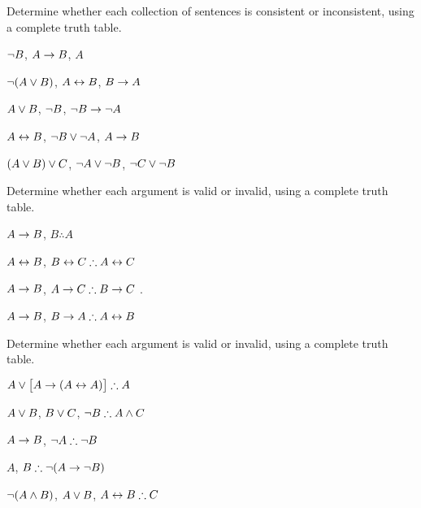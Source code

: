 \begin{practiceproblems}
\noindent\problempart
\label{pr.TT.satisfiable3}
Determine whether each collection of sentences is consistent or inconsistent, using a complete truth table.
\begin{earg}
\item $\neg B$, $A \rightarrow B$, $A$ \vspace{.5ex} \hfill {}
\item $\neg(A \vee B)$, $A \leftrightarrow B$, $B \rightarrow A$\vspace{.5ex} \hfill {}
\item $A \vee B$, $\neg B$, $\neg B \rightarrow \neg A$\vspace{.5ex} \hfill {}
\item $A \leftrightarrow B$, $\neg B \vee \neg A$, $A \rightarrow B$\vspace{.5ex} \hfill {} 
\item $(A \vee B) \vee C$, $\neg A \vee \neg B$, $\neg C \vee \neg B$\vspace{.5ex} \hfill {}
\end{earg}

\noindent\problempart
\label{pr.TT.valid2}
Determine whether each argument is valid or invalid, using a complete truth table.
\begin{earg}
\item $A\rightarrow B$, $B \therefore  A$ \hfill {}

\item $A\leftrightarrow B$, $B\eiff C \therefore A\eiff C$ \hfill {}

\item $A \rightarrow B$, $A \eif C\therefore B \eif C$ \hfill {}.

\item $A \rightarrow B$, $B \eif A\therefore A \eiff B$ \hfill {} 
\end{earg}

\noindent\problempart
\label{pr.TT.valid3}
Determine whether each argument is valid or invalid, using a complete truth table.
\begin{earg}
\item $A\eor\bigl[A\eif(A\eiff A)\bigr] \therefore  A $\vspace{.5ex} \hfill {}
\item $A\vee B$, $B\vee C$, $\enot B \therefore A \eand C$\vspace{.5ex} \hfill {}
\item $A \rightarrow B$, $\enot A\therefore \enot B$ \vspace{.5ex} \hfill {}
\item $A$, $B\therefore \enot(A\eif \enot B)$ \vspace{.5ex} \hfill {}
\item $\neg(A \mathbin{\wedge} B)$, $A \vee B$, $A \eiff B\therefore C$ \vspace{.5ex} \hfill {}
\end{earg}


\end{practiceproblems}
